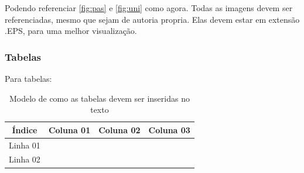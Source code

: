 Podendo referenciar \ref{fig:pas} e \ref{fig:uni} como agora. Todas as imagens devem ser referenciadas, mesmo que sejam de autoria propria. Elas devem estar em extensão .EPS, para uma melhor visualização.

\subsubsection{Tabelas}

Para tabelas:
\begin{table}[h]
  \centering
  \caption{ Modelo de como as tabelas devem ser inseridas no texto }
  \begin{tabular}{|c|c|c|c|}
    \hline 
    \textbf {Índice} & \textbf{Coluna 01} &\textbf{ Coluna 02} & \textbf{Coluna 03} \\ \hline \hline
    Linha 01 & & & \\ \hline
    Linha 02 & & & \\ \hline                         
  \end{tabular}
  \label{tab:modelo}
\end{table}


